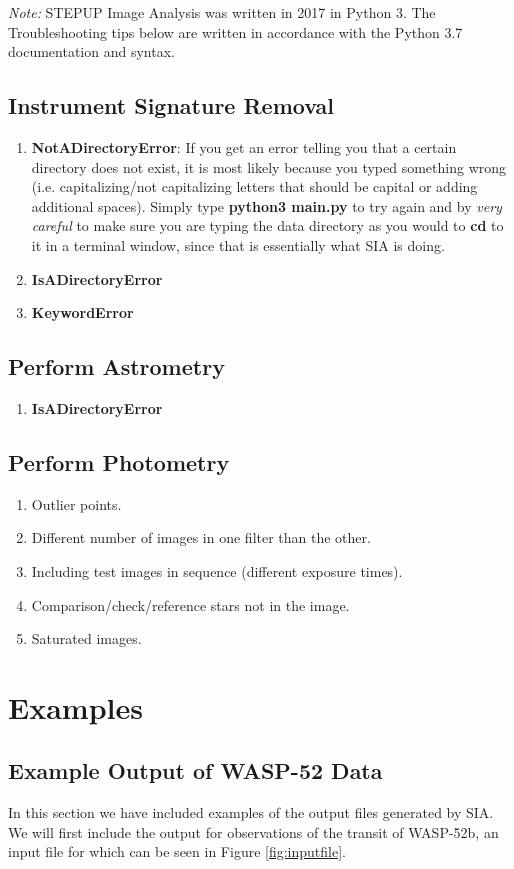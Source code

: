 \documentclass[11pt]{report}
\begin{document}
\emph{Note:} STEPUP Image Analysis was written in 2017 in Python 3. The Troubleshooting tips below are written in accordance with the Python 3.7 documentation and syntax. 

\section{Instrument Signature Removal}
\begin{enumerate}
\item {\bf NotADirectoryError}: If you get an error telling you that a certain directory does not exist, it is most likely because you typed something wrong (i.e. capitalizing/not capitalizing letters that should be capital or adding additional spaces). Simply type {\bf python3 main.py} to try again and by \emph{very careful} to make sure you are typing the data directory as you would to {\bf cd} to it in a terminal window, since that is essentially what SIA is doing.
\item {\bf IsADirectoryError}
\item {\bf KeywordError}
\end{enumerate}
\section{Perform Astrometry}
\begin{enumerate}
\item {\bf IsADirectoryError}
\end{enumerate}
\section{Perform Photometry}
\begin{enumerate}
\item Outlier points.
\item Different number of images in one filter than the other.
\item Including test images in sequence (different exposure times).
\item Comparison/check/reference stars not in the image.
\item Saturated images.
\end{enumerate}

\chapter{Examples}

\section{Example Output of WASP-52 Data}
In this section we have included examples of the output files generated by SIA. We will first include the output for observations of the transit of WASP-52b, an input file for which can be seen in Figure \ref{fig:inputfile}.
\end{document}
